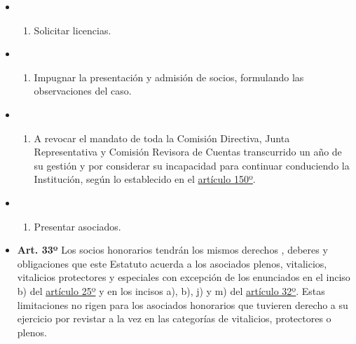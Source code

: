\documentclass[]{book}
\providecommand{\tightlist}{%
  \setlength{\itemsep}{0pt}\setlength{\parskip}{0pt}}
\begin{document}
\begin{itemize}
\begin{itemize}
\begin{enumerate}
    \end{enumerate}
  \item
    \begin{enumerate}
    \def\labelenumi{\alph{enumi})}
    \setcounter{enumi}{10}
    \tightlist
    \item
      Solicitar licencias.
    \end{enumerate}
  \item
    \begin{enumerate}
    \def\labelenumi{\alph{enumi})}
    \setcounter{enumi}{11}
    \tightlist
    \item
      Impugnar la presentación y admisión de socios, formulando las
      observaciones del caso.
    \end{enumerate}
  \item
    \begin{enumerate}
    \def\labelenumi{\alph{enumi})}
    \setcounter{enumi}{12}
    \tightlist
    \item
      A revocar el mandato de toda la Comisión Directiva, Junta
      Representativa y Comisión Revisora de Cuentas transcurrido un año
      de su gestión y por considerar su incapacidad para continuar
      conduciendo la Institución, según lo establecido en el
      \protect\hyperlink{art150}{artículo 150º}.
    \end{enumerate}
  \item
    \begin{enumerate}
    \def\labelenumi{\alph{enumi})}
    \setcounter{enumi}{13}
    \tightlist
    \item
      Presentar asociados.
    \end{enumerate}
  \end{itemize}
\end{itemize}

\begin{itemize}
\tightlist
\item
  \textbf{Art. 33º} Los socios honorarios tendrán los mismos derechos ,
  deberes y obligaciones que este Estatuto acuerda a los asociados
  plenos, vitalicios, vitalicios protectores y especiales con excepción
  de los enunciados en el inciso b) del
  \protect\hyperlink{art25}{artículo 25º} y en los incisos a), b), j) y
  m) del \protect\hyperlink{art32}{artículo 32º}. Estas limitaciones no
  rigen para los asociados honorarios que tuvieren derecho a su
  ejercicio por revistar a la vez en las categorías de vitalicios,
  protectores o plenos.
\end{itemize}
\end{document}
